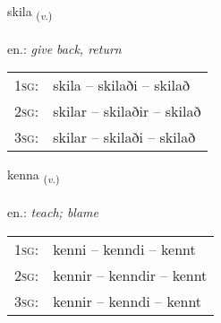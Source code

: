 \documentclass[frontgrid, backgrid]{flacards}\usepackage[]{graphicx}\usepackage[]{xcolor}
\begin{document}
\renewcommand{\flhead}{\vskip5pt \fboxsep=0pt {\small\bfseries\footnotesize Sagnorð | Verb}}
\renewcommand{\fcfoot}{\vskip5pt \fboxsep=0pt \hspace{2pt}{\small\bfseries\footnotesize 1K}}

\renewcommand{\blhead}{\vskip5pt {\small\bfseries\footnotesize Sagnorð | Verb }}
\renewcommand{\bcfoot}{\vskip5pt \hspace{2pt}{\small\bfseries\footnotesize 1K}}


{skila \small{\textsubscript{(\textit{v.})}} \\[1ex] %
\textphonetic{[scɪːla]} \\
en.: \emph{give back, return} \\  [2ex]
\renewcommand*{\arraystretch}{0.8}
\begin{tabular}{p{1cm}l}
\textsc{1sg}: & skila -- skilaði -- skilað \\ 
\textsc{2sg}: & skilar -- skilaðir -- skilað \\ 
\textsc{3sg}: & skilar -- skilaði -- skilað \\ 
\end{tabular}
}

\renewcommand{\flhead}{\vskip5pt \fboxsep=0pt {\small\bfseries\footnotesize Sagnorð | Verb}}
\renewcommand{\fcfoot}{\vskip5pt \fboxsep=0pt \hspace{2pt}{\small\bfseries\footnotesize 1K}}

\renewcommand{\blhead}{\vskip5pt {\small\bfseries\footnotesize Sagnorð | Verb }}
\renewcommand{\bcfoot}{\vskip5pt \hspace{2pt}{\small\bfseries\footnotesize 1K}}


{kenna \small{\textsubscript{(\textit{v.})}} \\[1ex] %
\textphonetic{[cʰɛna]} \\
en.: \emph{teach; blame} \\  [2ex]
\renewcommand*{\arraystretch}{0.8}
\begin{tabular}{p{1cm}l}
\textsc{1sg}: & kenni -- kenndi -- kennt \\ 
\textsc{2sg}: & kennir -- kenndir -- kennt \\ 
\textsc{3sg}: & kennir -- kenndi -- kennt \\ 
\end{tabular}
}
\end{document}
